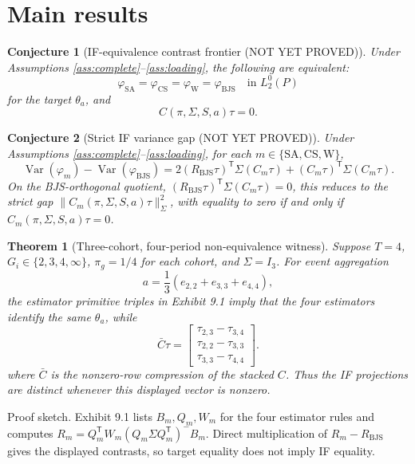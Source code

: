\documentclass[11pt]{article}
\newcommand{\transpose}{\mathsf{T}}
\theoremstyle{definition}
\theoremstyle{plain}
\newtheorem{theorem}{Theorem}
\newtheorem{conjecture}{Conjecture}
\theoremstyle{remark}
\begin{document}
\section{Main results}
\begin{conjecture}[IF-equivalence contrast frontier (NOT YET PROVED)]\label{conj:frontier}
Under Assumptions \ref{ass:complete}--\ref{ass:loading}, the following are
equivalent:
\[
\varphi_{\mathrm{SA}}=\varphi_{\mathrm{CS}}=\varphi_{\mathrm{W}}=\varphi_{\mathrm{BJS}}
\quad\text{in }L_2^0(P)
\]
for the target \(\theta_a\), and
\[
C(\pi,\Sigma,S,a)\tau=0 .
\]
\end{conjecture}

\begin{conjecture}[Strict IF variance gap (NOT YET PROVED)]\label{conj:gap}
Under Assumptions \ref{ass:complete}--\ref{ass:loading}, for each
\(m\in\{\mathrm{SA},\mathrm{CS},\mathrm{W}\}\),
\[
\operatorname{Var}(\varphi_m)-\operatorname{Var}(\varphi_{\mathrm{BJS}})
=2(R_{\mathrm{BJS}}\tau)^\transpose\Sigma(C_m\tau)
+(C_m\tau)^\transpose\Sigma(C_m\tau).
\]
On the BJS-orthogonal quotient,
\((R_{\mathrm{BJS}}\tau)^\transpose\Sigma(C_m\tau)=0\), this reduces to the
strict gap \(\|C_m(\pi,\Sigma,S,a)\tau\|^2_{\Sigma}\), with equality to zero if
and only if \(C_m(\pi,\Sigma,S,a)\tau=0\).
\end{conjecture}

\begin{theorem}[Three-cohort, four-period non-equivalence witness]\label{thm:witness}
Suppose \(T=4\), \(G_i\in\{2,3,4,\infty\}\), \(\pi_g=1/4\) for each cohort, and
\(\Sigma=I_3\). For event aggregation
\[
a=\frac13(e_{2,2}+e_{3,3}+e_{4,4}),
\]
the estimator primitive triples in Exhibit 9.1 imply that the four estimators
identify the same \(\theta_a\), while
\[
\bar C\tau=
\begin{bmatrix}
\tau_{2,3}-\tau_{3,4}\\
\tau_{2,2}-\tau_{3,3}\\
\tau_{3,3}-\tau_{4,4}
\end{bmatrix}.
\]
where \(\bar C\) is the nonzero-row compression of the stacked \(C\). Thus the
IF projections are distinct whenever this displayed vector is nonzero.
\end{theorem}
Proof sketch. Exhibit 9.1 lists \(B_m,Q_m,W_m\) for the four estimator rules and
computes \(R_m=Q_m^\transpose W_m(Q_m\Sigma Q_m^\transpose)^{-}B_m\). Direct
multiplication of \(R_m-R_{\mathrm{BJS}}\) gives the displayed contrasts, so
target equality does not imply IF equality.
\end{document}
